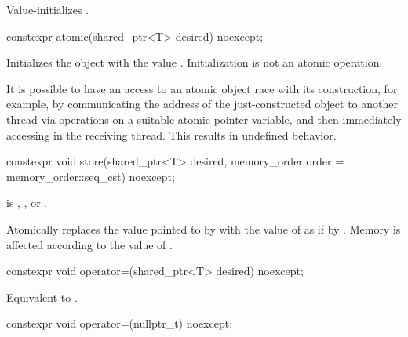 \begin{itemdescr}
\pnum
\effects
Value-initializes .
\end{itemdescr}

%
\begin{itemdecl}
constexpr atomic(shared_ptr<T> desired) noexcept;
\end{itemdecl}

\begin{itemdescr}
\pnum
\effects
Initializes the object with the value .
Initialization is not an atomic operation.
\begin{note}
It is possible to have an access to
an atomic object  race with its construction,
for example,
by communicating the address of the just-constructed object 
to another thread via  operations
on a suitable atomic pointer variable, and
then immediately accessing  in the receiving thread.
This results in undefined behavior.
\end{note}
\end{itemdescr}

%
\begin{itemdecl}
constexpr void store(shared_ptr<T> desired, memory_order order = memory_order::seq_cst) noexcept;
\end{itemdecl}

\begin{itemdescr}
\pnum
\expects
{} is
,
, or
.

\pnum
\effects
Atomically replaces the value pointed to by  with
the value of  as if by .
Memory is affected according to the value of .
\end{itemdescr}

%
\begin{itemdecl}
constexpr void operator=(shared_ptr<T> desired) noexcept;
\end{itemdecl}

\begin{itemdescr}
\pnum
\effects
Equivalent to .
\end{itemdescr}

%
\begin{itemdecl}
constexpr void operator=(nullptr_t) noexcept;
\end{itemdecl}

